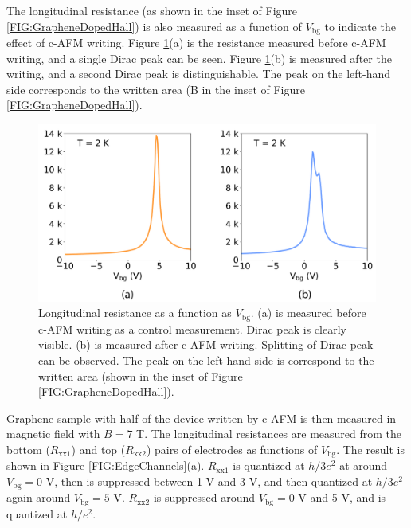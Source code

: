 \documentclass[pdflatex, sectionletters, 12pt]{pittetd}    %
\begin{document}
The longitudinal resistance (as shown in the inset of Figure \ref{FIG:GrapheneDopedHall}) is also measured as a function of $V_\mathrm{bg}$ to indicate the effect of c-AFM writing. Figure \ref{FIG:DiracPointSplit}(a) is the resistance measured before c-AFM writing, and a single Dirac peak can be seen. Figure \ref{FIG:DiracPointSplit}(b) is measured after the writing, and a second Dirac peak is distinguishable. The peak on the left-hand side corresponds to the written area (B in the inset of Figure \ref{FIG:GrapheneDopedHall}).
\\

\begin{figure}[h!]
	\centering
	\includegraphics[width=.75\textwidth]{Drawing/DiracPointSplit.pdf}
	\caption{Longitudinal resistance as a function as $V_\mathrm{bg}$. (a) is measured before c-AFM writing as a control measurement. Dirac peak is clearly visible. (b) is measured after c-AFM writing. Splitting of Dirac peak can be observed. The peak on the left hand side is correspond to the written area (shown in the inset of Figure \ref{FIG:GrapheneDopedHall}).}
	\label{FIG:DiracPointSplit}
\end{figure}

Graphene sample with half of the device written by c-AFM is then measured in magnetic field with $B = 7$ T. The longitudinal resistances are measured from the bottom ($R_\mathrm{xx1}$) and top ($R_\mathrm{xx2}$) pairs of electrodes as functions of $V_\mathrm{bg}$. The result is shown in Figure \ref{FIG:EdgeChannels}(a). $R_\mathrm{xx1}$ is quantized at $h/3e^2$ at around $V_\mathrm{bg} = 0$ V, then is suppressed between 1 V and 3 V, and then quantized at $h/3e^2$ again around $V_\mathrm{bg} = 5$ V. $R_\mathrm{xx2}$ is suppressed around $V_\mathrm{bg} = 0$ V and 5 V, and is quantized at $h/e^2$. 
\end{document}
